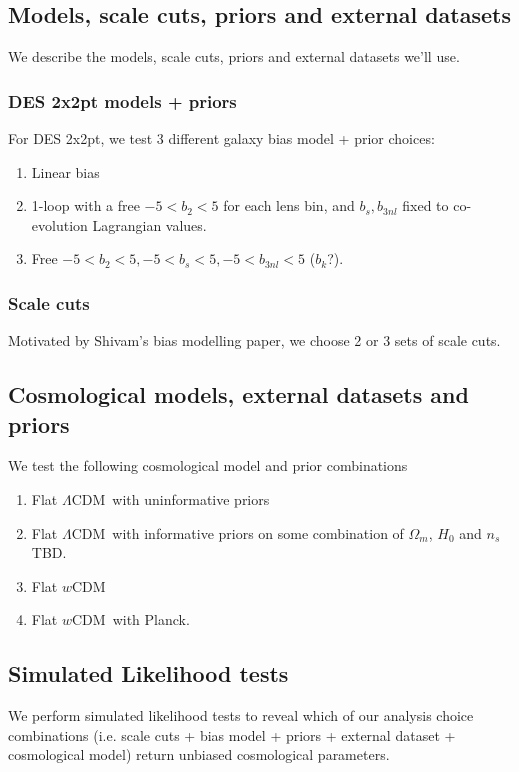 \documentclass[fleqn,usenatbib]{mnras}
\newcommand{\lcdm}{$\Lambda$CDM}
\newcommand{\wcdm}{$w$CDM}
\begin{document}
\subsection{Models, scale cuts, priors and external datasets}
We describe the models, scale cuts, priors and external datasets we'll use.

\subsubsection{DES 2x2pt models + priors}
For DES 2x2pt, we test 3 different galaxy bias model + prior choices:
\begin{enumerate}
    \item Linear bias
    \item 1-loop with a free $-5<b_2<5$ for each lens bin, and $b_s, b_{3nl}$ fixed to co-evolution Lagrangian values.
    \item Free $-5<b_2<5, -5<b_s<5, -5<b_{3nl}<5$ ($b_k$?).
\end{enumerate}

\subsubsection{Scale cuts}
Motivated by Shivam's bias modelling paper, we choose 2 or 3 sets of scale cuts.

\subsection{Cosmological models, external datasets and priors}
We test the following cosmological model and prior combinations
\begin{enumerate}
    \item Flat \lcdm\ with uninformative priors
    \item Flat \lcdm\ with informative priors on some combination of $\Omega_m$, $H_0$ and $n_s$ TBD.
    \item Flat \wcdm 
    \item Flat \wcdm\ with Planck.
\end{enumerate}

\subsection{Simulated Likelihood tests}

We perform simulated likelihood tests to reveal which of our analysis choice combinations (i.e. scale cuts + bias model + priors + external dataset + cosmological model) return unbiased cosmological parameters.
\end{document}
